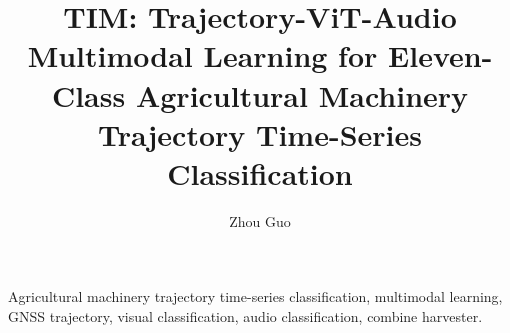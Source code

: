 \documentclass[preprint,12pt,authoryear]{elsarticle}
\newcommand{\ours}{TIM}
\newcommand{\task}{Agricultural Machinery Trajectory Time-Series Classification}
\begin{document}
\begin{frontmatter}

\title{\ours{}: Trajectory-ViT-Audio Multimodal Learning for Eleven-Class \task{}}

\author[caus]{Zhou Guo}
\address[caus]{College of Information and Electrical Engineering, China Agricultural University, Beijing 100083, China}

\begin{abstract}

\end{abstract}

\begin{keyword}
Agricultural machinery trajectory time-series classification, multimodal learning, GNSS trajectory, visual classification, audio classification, combine harvester.
\end{keyword}

\end{frontmatter}










\end{document}
